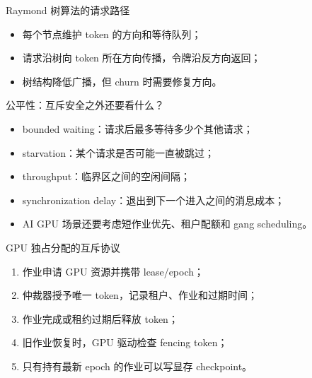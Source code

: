 \documentclass[UTF8,fontset=none,aspectratio=169,10pt]{beamer}
\begin{document}
\begin{frame}{Raymond 树算法的请求路径}
\begin{center}
\end{center}
\begin{itemize}
  \item 每个节点维护 token 的方向和等待队列；
  \item 请求沿树向 token 所在方向传播，令牌沿反方向返回；
  \item 树结构降低广播，但 churn 时需要修复方向。
\end{itemize}
\end{frame}

\begin{frame}{公平性：互斥安全之外还要看什么？}
\begin{itemize}
  \item bounded waiting：请求后最多等待多少个其他请求；
  \item starvation：某个请求是否可能一直被跳过；
  \item throughput：临界区之间的空闲间隔；
  \item synchronization delay：退出到下一个进入之间的消息成本；
  \item AI GPU 场景还要考虑短作业优先、租户配额和 gang scheduling。
\end{itemize}
\end{frame}

\begin{frame}{GPU 独占分配的互斥协议}
\begin{enumerate}
  \item 作业申请 GPU 资源并携带 lease/epoch；
  \item 仲裁器授予唯一 token，记录租户、作业和过期时间；
  \item 作业完成或租约过期后释放 token；
  \item 旧作业恢复时，GPU 驱动检查 fencing token；
  \item 只有持有最新 epoch 的作业可以写显存 checkpoint。
\end{enumerate}
\end{frame}
\end{document}
